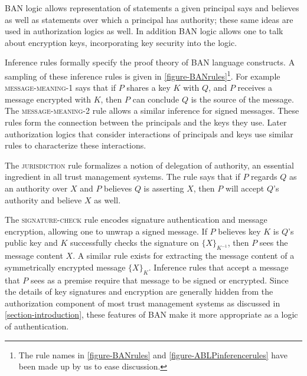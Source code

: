 BAN logic allows representation of statements a given principal says
and believes as well as statements over which a principal has
authority; these same ideas are used in authorization logics as
well. In addition BAN logic allows one to talk about encryption keys,
incorporating key security into the logic.

Inference rules formally specify the proof theory of BAN language
constructs. A sampling of these inference rules is given in
\autoref{figure-BANrules}\footnote{The rule names in \autoref{figure-BANrules} 
and \autoref{figure-ABLPinferencerules}
have been made up by us to ease discussion.}. For example
\textsc{message-meaning-1} says that if $P$ shares a key $K$ with $Q$, and
$P$ receives a message encrypted with $K$, then $P$ can conclude $Q$
is the source of the message. The \textsc{message-meaning-2} rule allows a
similar inference for signed messages. These rules form the connection
between the principals and the keys they use.  Later authorization
logics that consider interactions of principals and keys use similar
rules to characterize these interactions.

\BANrulesfig

The \textsc{jurisdiction} rule formalizes a notion of delegation of
authority, an essential ingredient in all trust management systems. The
rule says that if $P$ regards $Q$ as an authority over $X$ and $P$ believes
$Q$ is asserting $X$, then $P$ will accept $Q$'s authority and believe $X$
as well.

The \textsc{signature-check} rule encodes signature authentication and
message encryption, allowing one to unwrap a signed message. If $P$
believes key $K$ is $Q$'s public key and $K$ successfully checks the
signature on $\{X\}_{K^{-1}}$, then $P$ sees the message content $X$.
A similar rule exists for extracting the message content of a
symmetrically encrypted message $\{X\}_K$.  Inference rules that
accept a message that $P$ sees as a premise require that message to
be signed or encrypted.  Since the details of key
signatures and encryption are generally hidden from the authorization
component of most trust management systems as discussed in
\autoref{section-introduction}, these features of BAN make it more
appropriate as a logic of authentication.

